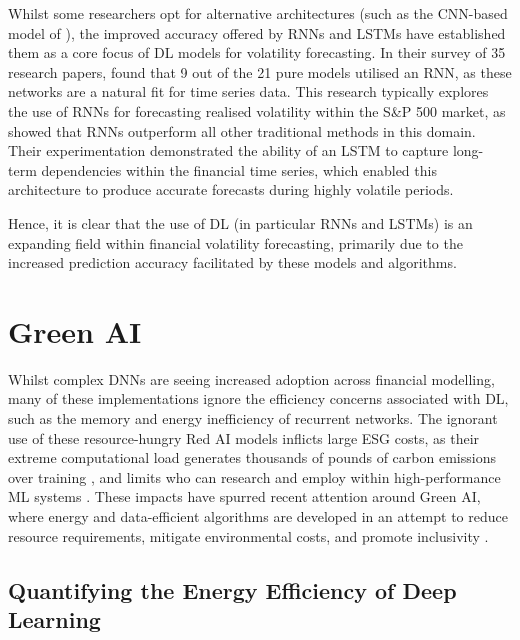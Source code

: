 \documentclass[a4paper, 11pt]{report}
\begin{document}
    Whilst some researchers opt for alternative architectures (such as the CNN-based model of \citet{chen-2018}), the improved accuracy offered by RNNs and LSTMs have established them as a core focus of DL models for volatility forecasting. In their survey of 35 research papers, \citet{ge-2022} found that 9 out of the 21 pure models utilised an RNN, as these networks are a natural fit for time series data. This research typically explores the use of RNNs for forecasting realised volatility within the S\&P 500 market, as \citet{bucci-2020} showed that RNNs outperform all other traditional methods in this domain. Their experimentation demonstrated the ability of an LSTM to capture long-term dependencies within the financial time series, which enabled this architecture to produce accurate forecasts during highly volatile periods.

    Hence, it is clear that the use of DL (in particular RNNs and LSTMs) is an expanding field within financial volatility forecasting, primarily due to the increased prediction accuracy facilitated by these models and algorithms.


    \section{Green AI}

    Whilst complex DNNs are seeing increased adoption across financial modelling, many of these implementations ignore the efficiency concerns associated with DL, such as the memory and energy inefficiency of recurrent networks. The ignorant use of these resource-hungry Red AI models inflicts large ESG costs, as their extreme computational load generates thousands of pounds of carbon emissions over training \citep{strubell-2019}, and limits who can research and employ within high-performance ML systems \citep{bender-2021}. These impacts have spurred recent attention around Green AI, where energy and data-efficient algorithms are developed in an attempt to reduce resource requirements, mitigate environmental costs, and promote inclusivity \citep{schwartz-2019}.


    \subsection{Quantifying the Energy Efficiency of Deep Learning}
\end{document}
